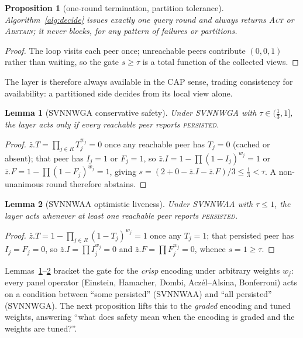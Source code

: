 \documentclass[11pt]{article}
\newtheorem{proposition}{Proposition}
\newtheorem{lemma}{Lemma}
\begin{document}
\begin{proposition}[one-round termination, partition tolerance]\label{prop:terminate}
Algorithm~\ref{alg:decide} issues exactly one query round and always returns \textsc{Act} or
\textsc{Abstain}; it never blocks, for any pattern of failures or partitions.
\end{proposition}
\begin{proof}
The loop visits each peer once; unreachable peers contribute $(0,0,1)$ rather than waiting, so the gate
$s\ge\tau$ is a total function of the collected views.
\end{proof}
\noindent The layer is therefore always available in the CAP sense, trading consistency for
availability: a partitioned side decides from its local view alone.

\begin{lemma}[SVNNWGA conservative safety]\label{lem:wga}
Under SVNNWGA with $\tau\in(\tfrac13,1]$, the layer acts only if \emph{every} reachable peer reports
\textsc{persisted}.
\end{lemma}
\begin{proof}
$\bar z.T=\prod_{j\in R}T_j^{w_j}=0$ once any reachable peer has $T_j=0$ (cached or absent); that peer
has $I_j=1$ or $F_j=1$, so $\bar z.I=1-\prod(1-I_j)^{w_j}=1$ or $\bar z.F=1-\prod(1-F_j)^{w_j}=1$, giving
$s=(2+0-\bar z.I-\bar z.F)/3\le\tfrac13<\tau$. A non-unanimous round therefore abstains.
\end{proof}

\begin{lemma}[SVNNWAA optimistic liveness]\label{lem:waa}
Under SVNNWAA with $\tau\le1$, the layer acts whenever at least one reachable peer reports
\textsc{persisted}.
\end{lemma}
\begin{proof}
$\bar z.T=1-\prod_{j\in R}(1-T_j)^{w_j}=1$ once any $T_j=1$; that persisted peer has $I_j=F_j=0$, so
$\bar z.I=\prod I_j^{w_j}=0$ and $\bar z.F=\prod F_j^{w_j}=0$, whence $s=1\ge\tau$.
\end{proof}

\noindent Lemmas~\ref{lem:wga}--\ref{lem:waa} bracket the gate for the \emph{crisp} encoding under
arbitrary weights $w_j$: every panel operator (Einstein, Hamacher, Dombi, Acz\'el--Alsina, Bonferroni)
acts on a condition between ``some persisted'' (SVNNWAA) and ``all persisted'' (SVNNWGA). The next
proposition lifts this to the \emph{graded} encoding and tuned weights, answering ``what does safety mean
when the encoding is graded and the weights are tuned?''.
\end{document}
